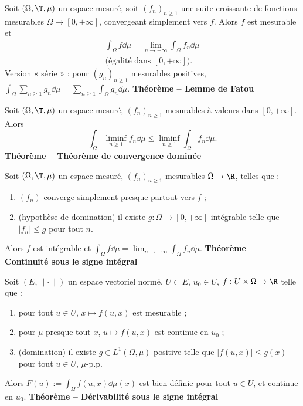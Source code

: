 Soit $(\Omega,\T,\mu)$ un espace mesuré, soit $(f_n)_{n\ge1}$ une suite croissante de fonctions mesurables $\Omega\to[0,+\infty]$, convergeant simplement vers $f$. Alors $f$ est mesurable et
\[
\begin{gathered}
\int_\Omega f\dd\mu=\lim_{n\to+\infty}\int_\Omega f_n\dd\mu\\
\text{(égalité dans }[0,+\infty]\text{)}.
\end{gathered}
\]
Version « série » : pour $(g_n)_{n\ge1}$ mesurables positives, $\int_\Omega\sum_{n\ge1}g_n\dd\mu=\sum_{n\ge1}\int_\Omega g_n\dd\mu$.
\textbf{Théorème – Lemme de Fatou}

Soit $(\Omega,\T,\mu)$ un espace mesuré, $(f_n)_{n\ge1}$ mesurables à valeurs dans $[0,+\infty]$. Alors
\[\int_\Omega\liminf_{n\ge1}f_n\dd\mu\le\liminf_{n\ge1}\int_\Omega f_n\dd\mu.\]
\textbf{Théorème – Théorème de convergence dominée}

Soit $(\Omega,\T,\mu)$ un espace mesuré, $(f_n)_{n\ge1}$ mesurables $\Omega\to\R$, telles que :
\begin{enumerate}
\item $(f_n)$ converge simplement presque partout vers $f$ ;
\item (hypothèse de domination) il existe $g:\Omega\to[0,+\infty]$ intégrable telle que $|f_n|\le g$ pour tout $n$.
\end{enumerate}
Alors $f$ est intégrable et $\int_\Omega f\dd\mu=\lim_{n\to+\infty}\int_\Omega f_n\dd\mu$.
\textbf{Théorème – Continuité sous le signe intégral}

Soit $(E,\|\cdot\|)$ un espace vectoriel normé, $U\subset E$, $u_0\in U$, $f:U\times\Omega\to\R$ telle que :
\begin{enumerate}
\item pour tout $u\in U$, $x\mapsto f(u,x)$ est mesurable ;
\item pour $\mu$-presque tout $x$, $u\mapsto f(u,x)$ est continue en $u_0$ ;
\item (domination) il existe $g\in L^1(\Omega,\mu)$ positive telle que $|f(u,x)|\le g(x)$ pour tout $u\in U$, $\mu$-p.p.
\end{enumerate}
Alors $F(u):=\int_\Omega f(u,x)\dd\mu(x)$ est bien définie pour tout $u\in U$, et continue en $u_0$.
\textbf{Théorème – Dérivabilité sous le signe intégral}

